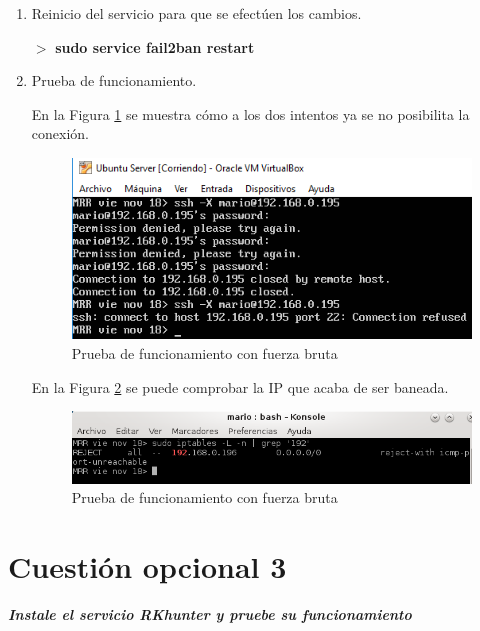 \begin{enumerate}
	\item Reinicio del servicio para que se efectúen los cambios.
	
	$ > $ \textbf{sudo service fail2ban restart}
	
	\newpage
	
	\item Prueba de funcionamiento.
	
	En la Figura \ref{fig:figura24} se muestra cómo a los dos intentos
	ya se no posibilita la conexión.
	\begin{figure}[H] %
		\centering
		\includegraphics[scale=0.9]{figuras/figura24.png} 
		\caption{Prueba de funcionamiento con fuerza bruta} 
		\label{fig:figura24}
	\end{figure}
	
	En la Figura \ref{fig:figura27} se puede comprobar la IP que acaba de ser baneada.
	\begin{figure}[H] %
		\centering
		\includegraphics[scale=0.7]{figuras/figura27.png} 
		\caption{Prueba de funcionamiento con fuerza bruta} 
		\label{fig:figura27}
	\end{figure}
\end{enumerate}

\newpage

\section{Cuestión opcional 3}
\textbf{\textit{Instale el servicio RKhunter y pruebe su funcionamiento}} \cite{enlace30}

